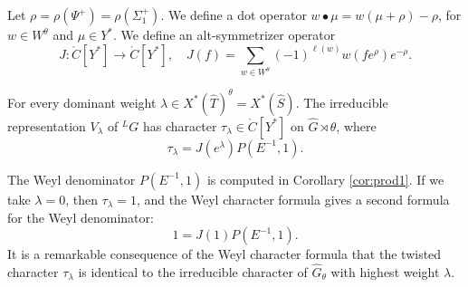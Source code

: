 Let $\rho = \rho(\Psi^+) = \rho(\Sigma^+_1)$.  We define a dot
operator $w\bullet \mu = w(\mu+\rho)-\rho$, for $w\in W^\theta$ and
$\mu\in Y^*$.  We define an alt-symmetrizer operator
\[
J:\ring{C}[Y^*]\to \ring{C}[Y^*],
\quad J(f) = \sum_{w\in W^\theta} (-1)^{\ell(w)} w(f e^\rho) e^{-\rho}.
\]

\begin{theorem}  
  For every dominant weight $\lambda\in X^*(\hat T)^\theta = X^*(\hat
  S)$.  The irreducible representation $V_\lambda$ of ${}^LG$ has
  character $\tau_\lambda\in \ring{C}[Y^*]$ on $\hat G\rtimes \theta$,
  where
\[
\tau_\lambda = J(e^\lambda) P(E^{-1},1).
\]
\end{theorem}


The Weyl denominator $P(E^{-1},1)$ is computed in Corollary
\ref{cor:prod1}.  If we take $\lambda=0$, then $\tau_\lambda=1$, and
the Weyl character formula gives a second formula for the Weyl
denominator:
\begin{equation}\label{eqn:wd2}
1= J(1) P(E^{-1},1).
\end{equation}
It is a remarkable consequence of the Weyl character formula that the
twisted character $\tau_\lambda$ is identical to the irreducible
character of $\hat G_\theta$ with highest weight $\lambda$.


